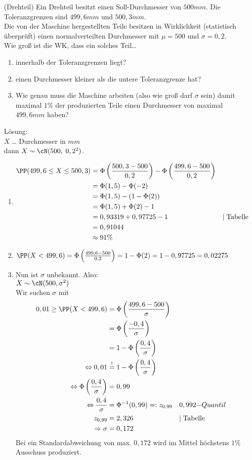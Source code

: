 \documentclass{scrreprt}
\renewenvironment{anumerate}{\begin{enumerate}[label=(\alph*)]}{\end{enumerate}} %
\begin{document}
 (Drehteil) Ein Drehteil besitzt einen Soll-Durchmesser von $500\unit{mm}$. Die Toleranzgrenzen sind $499,6\unit{mm}$ und $500,3 \unit{mm}$.\\
Die von der Maschine hergestellten Teile besitzen in Wirklichkeit (statistisch überprüft) einen normalverteilten Durchmesser mit $\mu=500$ und $\sigma = 0,2$.\\
Wie groß ist die WK, dass ein solches Teil…
\begin{anumerate}
\item innerhalb der Toleranzgrenzen liegt?
\item einen Durchmesser kleiner als die untere Toleranzgrenze hat?
\item Wie genau muss die Maschine arbeiten (also wie groß darf $\sigma$ sein) damit maximal $1\%$ der produzierten Teile einen Durchmesser von maximal $499,6\unit{mm}$ haben?
\end{anumerate}
Lösung:\\
$X$ … Durchmesser in $\unit{mm}$\\
dann $X \sim \cN(500,\; 0,2^2)$.
\begin{anumerate}
\item 
\begin{align*}
\PP(499,6 \leq X \leq 500,3)&=\Phi \left(\frac{500,3-500}{0,2}\right)-\Phi \left(\frac{499,6-500}{0,2}\right)\\
&=\Phi(1,5)-\Phi(-2)\\
&= \Phi (1,5)-(1-\Phi(2))\\
&= \Phi(1,5)+\Phi(2)-1\\
&= 0,93319+0,97725-1 &&|\;\mathrm{Tabelle}\\
&= 0,91044\\
&\approx 91\%
\end{align*}
\item $\PP(X<499,6) = \Phi\left(\frac{499,6-500}{0,2}\right) = 1-\Phi(2)=1-0,97725=0,02275$
\item Nun ist $\sigma$ unbekannt. Also:\\
$X\sim \cN(500, \sigma^2)$\\
Wir suchen $\sigma$ mit 
\begin{align*}
0,01\geq\PP(X<499,6) &= \Phi\left(\frac{499,6-500}{\sigma}\right)\\
&=\Phi\left(\frac{-0,4}{\sigma}\right)\\
&=1-\Phi\left(\frac{0,4}{\sigma}\right)\\
\Leftrightarrow 0,01 &\overset{!}{=}1-\Phi\left(\frac{0,4}{\sigma}\right)\\
\Leftrightarrow \Phi\left(\frac{0,4}{\sigma}\right) &= 0,99\\
\Leftrightarrow \frac{0,4}{\sigma}&=\Phi^{-1}(0,99) =:z_{0,99} && 0,99\mathrm2{-Quantil}\\
z_{0,99}&=2,326 && |\; \mathrm{Tabelle}\\
\Rightarrow \sigma &=0,172
\end{align*}
Bei ein Standardabweichung von max. $0,172$ wird im Mittel höchstens $1\%$ Ausschuss produziert.
\end{anumerate}
\end{document}
